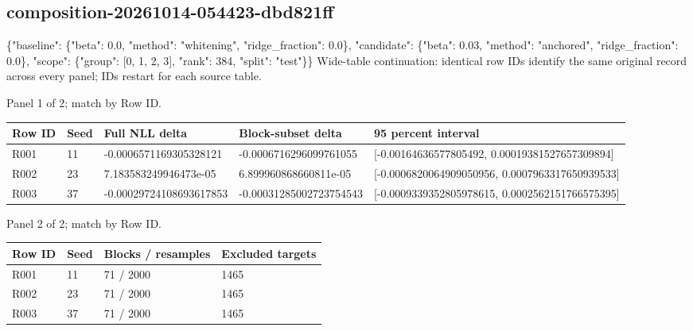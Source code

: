 \documentclass[10pt]{article}
\begin{document}
\subsection{composition-20261014-054423-dbd821ff}
\{"baseline": \{"beta": 0.0, "method": "whitening", "ridge\_fraction": 0.0\}, "candidate": \{"beta": 0.03, "method": "anchored", "ridge\_fraction": 0.0\}, "scope": \{"group": [0, 1, 2, 3], "rank": 384, "split": "test"\}\}
Wide-table continuation: identical row IDs identify the same original record across every panel; IDs restart for each source table.
\par\noindent Panel 1 of 2; match by Row ID.
{\scriptsize\setlength{\tabcolsep}{2pt}
\begin{longtable}{p{}p{}p{}p{}p{}}
Row ID & Seed & Full NLL delta & Block-subset delta & 95 percent interval \\
\hline\endhead
R001 & 11 & -0.0006571169305328121 & -0.0006716296099761055 & [-0.00164636577805492, 0.00019381527657309894] \\
R002 & 23 & 7.183583249946473e-05 & 6.899960868660811e-05 & [-0.0006820064909050956, 0.0007963317650939533] \\
R003 & 37 & -0.00029724108693617853 & -0.00031285002723754543 & [-0.0009339352805978615, 0.0002562151766575395] \\
\end{longtable}}
\par\noindent Panel 2 of 2; match by Row ID.
{\scriptsize\setlength{\tabcolsep}{2pt}
\begin{longtable}{p{}p{}p{}p{}}
Row ID & Seed & Blocks / resamples & Excluded targets \\
\hline\endhead
R001 & 11 & 71 / 2000 & 1465 \\
R002 & 23 & 71 / 2000 & 1465 \\
R003 & 37 & 71 / 2000 & 1465 \\
\end{longtable}}
\end{document}
